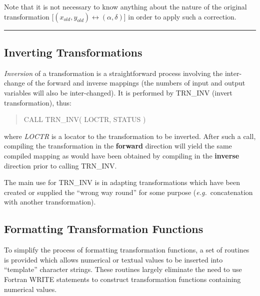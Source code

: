 \documentclass[twoside,nolof,11pt]{starlink}
\providecommand{\name}[1]{\small{#1}}
\providecommand{\fortvar}[1]{\emph{#1}}
\providecommand{\exampledone}[0]{\begin{center} \rule{6em}{0.2mm} \end{center}}
\begin{document}
Note that it is not necessary to know anything about the nature of the
original transformation \mbox{[$(x_{old},y_{old}) \leftrightarrow
(\alpha,\delta)$]} in order to apply such a correction.
\exampledone


\subsection{Inverting Transformations}

\label{section:additional:inverting}

\emph{Inversion} of a transformation is a straightforward process involving
the inter-change of the forward and inverse mappings (the numbers of input
and output variables will also be inter-changed).
It is performed by \name{TRN\_INV} (invert transformation), thus:

\begin{quote}
\begin{terminalv}
CALL TRN_INV( LOCTR, STATUS )
\end{terminalv}
\end{quote}

where \fortvar{LOCTR} is a locator to the transformation to be inverted.
After such a call, compiling the transformation in the \textbf{forward}
direction will yield the same compiled mapping as would have been obtained
by compiling in the \textbf{ inverse} direction prior to calling
\name{TRN\_INV}.

The main use for \name{TRN\_INV} is in adapting transformations which have
been created or supplied the ``wrong way round'' for some purpose
(\emph{e.g.}\ concatenation with another transformation).


\subsection{Formatting Transformation Functions}

\label{section:additional:formatting}

To simplify the process of formatting transformation functions, a set of
routines is provided which allows numerical or textual values to be inserted
into ``template'' character strings.
These routines largely eliminate the need to use \name{Fortran} \name{WRITE}
statements to construct transformation functions containing numerical
values.
\end{document}
